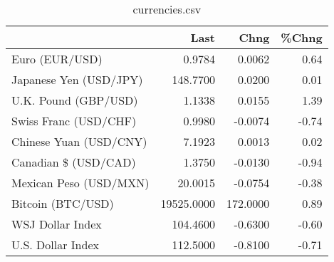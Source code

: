 \documentclass{article}%
\begin{document}
%


\begin{table}[htbp]%
\caption{currencies.csv}%
\centering%
\begin{adjustbox}{width=1\textwidth}%
\begin{tabular}{lrrr}
\toprule
                       &       Last &     Chng &  \%Chng \\
\midrule
        Euro (EUR/USD) &     0.9784 &   0.0062 &   0.64 \\
Japanese Yen (USD/JPY) &   148.7700 &   0.0200 &   0.01 \\
  U.K. Pound (GBP/USD) &     1.1338 &   0.0155 &   1.39 \\
 Swiss Franc (USD/CHF) &     0.9980 &  -0.0074 &  -0.74 \\
Chinese Yuan (USD/CNY) &     7.1923 &   0.0013 &   0.02 \\
  Canadian \$ (USD/CAD) &     1.3750 &  -0.0130 &  -0.94 \\
Mexican Peso (USD/MXN) &    20.0015 &  -0.0754 &  -0.38 \\
     Bitcoin (BTC/USD) & 19525.0000 & 172.0000 &   0.89 \\
      WSJ Dollar Index &   104.4600 &  -0.6300 &  -0.60 \\
     U.S. Dollar Index &   112.5000 &  -0.8100 &  -0.71 \\
\bottomrule
\end{tabular}
%
\end{adjustbox}%
\end{table}

%
\end{document}

